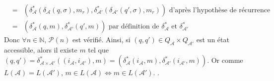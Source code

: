 \documentclass{article}
\newcommand{\bb}[1]{\mathbb{#1}}
\begin{document}
\begin{enumerate}
\begin{eqnarray*}
        & = & (\delta_\mathcal{A}^*(\delta_\mathcal{A}(q, \sigma), m_r),\delta_{\mathcal{A}'}^*(\delta_{\mathcal{A}'}(q', \sigma), m_r)) \text{ d'après l'hypothèse de récurrence} \\
        & = & (\delta_\mathcal{A}^*(q, m),\delta_{\mathcal{A}'}^*(q',  m)) \text{ par définition de $\delta_\mathcal{A}^*$ et $\delta_{\mathcal{A}'}^*$}
    \end{eqnarray*}
    Donc $\forall n \in \bb{N}$, $\mathcal{P}(n)$ est vérifié. Ainsi, si $(q, q') \in Q_\mathcal{A} \times Q_{\mathcal{A}'}$ est un état accessible, alors il existe $m$ tel que $(q, q') = \delta_{\mathcal{A} \times \mathcal{A}'}^*((i_\mathcal{A}, i_{\mathcal{A}'}), m) = (\delta_\mathcal{A}^*(i_\mathcal{A}, m),\delta_{\mathcal{A}'}^*(i_\mathcal{A'}, m))$.\newline 
    Or comme $L(\mathcal{A}) = L(\mathcal{A}')$, $m \in L(\mathcal{A}) \Longleftrightarrow  m \in L(\mathcal{A'})$.  .


\end{enumerate}
\end{document}
